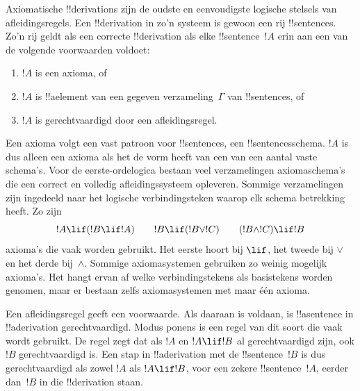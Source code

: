 \documentclass[../../../include/open-logic-section]{subfiles}
\begin{document}
      {}
      {}


Axiomatische !!{derivation}s zijn de oudste en eenvoudigste logische
stelsels van afleidingsregels. Een !!{derivation} in zo'n systeem is
gewoon een rij !!{sentence}s. Zo'n rij geldt als een correcte
!!{derivation} als elke !!{sentence}~$!A$ erin aan een van de volgende
voorwaarden voldoet:
\begin{enumerate}
\item $!A$ is een axioma, of
\item $!A$ is !!a{element} van een gegeven verzameling~$\Gamma$ van !!{sentence}s, of
\item $!A$ is gerechtvaardigd door een afleidingsregel.
\end{enumerate}
Een axioma volgt een vast patroon voor !!{sentence}s, een
!!{sentence}sschema. $!A$ is dus alleen een axioma als het de vorm heeft
van een van een aantal vaste schema's. Voor de eerste-ordelogica bestaan
veel verzamelingen axiomaschema's die een correct en volledig
afleidingssysteem opleveren. Sommige verzamelingen
zijn ingedeeld naar het logische verbindingsteken waarop elk schema
betrekking heeft. Zo zijn
\[
!A \lif (!B \lif !A) \qquad !B \lif (!B \lor !C) \qquad (!B \land !C) \lif !B
\]
axioma's die vaak worden gebruikt. Het eerste hoort bij $\lif$, het
tweede bij $\lor$ en het derde bij~$\land$.
Sommige axiomasystemen gebruiken zo weinig mogelijk axioma's. Het hangt
ervan af welke verbindingstekens als basistekens worden genomen, maar
er bestaan zelfs axiomasystemen met maar één axioma.

Een afleidingsregel geeft een voorwaarde. Als daaraan is voldaan, is
!!a{sentence} in !!a{derivation} gerechtvaardigd. Modus ponens is een
regel van dit soort die vaak wordt gebruikt. De regel zegt dat als $!A$
en $!A \lif !B$ al gerechtvaardigd zijn, ook $!B$ gerechtvaardigd is. Een stap
in !!a{derivation} met de !!{sentence}~$!B$ is dus gerechtvaardigd als
zowel $!A$ als $!A \lif !B$, voor een zekere !!{sentence}~$!A$, eerder
dan~$!B$ in die !!{derivation} staan.
\end{document}
